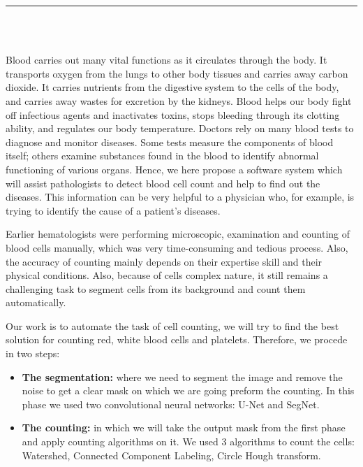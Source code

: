 \pagestyle{myfancy}


\setcounter{page}{1}

\begin{center}
    {\color{Black} \rule{6.2in}{1.4mm} }\\
    \vspace{0.1in}
    \scshape{\fontsize{34}{46}{\bfseries{\color{Black}{Introduction}}
    }}
    \\
    
    \vspace{0.5in}
\end{center}
\hspace*{0.16in}

Blood carries out many vital functions as it circulates through the body. It transports oxygen from the lungs to other body tissues and carries away carbon dioxide. It carries nutrients from the digestive system to the cells of the body, and carries away wastes for excretion by the kidneys. Blood helps our body fight off infectious agents and inactivates toxins, stops bleeding through its clotting ability, and regulates our body temperature. Doctors rely on many blood tests to diagnose and monitor diseases. Some tests measure the components of blood itself; others examine substances found in the blood to identify abnormal functioning of various organs. Hence, we here propose a software system which will assist pathologists to detect blood cell count and help to find out the diseases. This information can be very helpful to a physician who, for example, is trying to identify the cause of a patient's diseases.

Earlier hematologists were performing microscopic, examination and counting of blood cells manually, which was very time-consuming and tedious process. Also, the accuracy of counting mainly depends on their expertise skill and their physical conditions. Also, because of cells complex nature, it still remains a challenging task to segment cells from its background and count them automatically.

Our work is to automate the task of cell counting, we will try to find the best solution for counting red, white blood cells and platelets. Therefore, we procede in two steps:
\begin{itemize}
    \item \textbf{The segmentation:} where we need to segment the image and remove the noise to get a clear mask on which we are going preform the counting. In this phase we used two convolutional neural networks: U-Net and SegNet.
    \item \textbf{The counting:} in which we will take the output mask from the first phase and apply counting algorithms on it. We used 3 algorithms to count the cells: Watershed, Connected Component Labeling, Circle Hough transform.\
\end{itemize}

